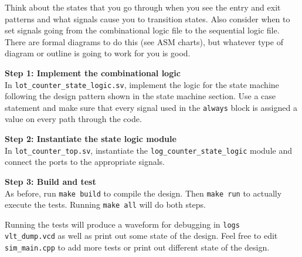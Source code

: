 \documentclass{article}
\begin{document}
Think about the states that you go through when you see the entry and exit
patterns and what signals cause you to transition states. Also consider when to
set signals going from the combinational logic file to the sequential logic
file. There are formal diagrams to do this (see ASM charts), but whatever type
of diagram or outline is going to work for you is good.

\noindent\textbf{Step 1: Implement the combinational logic}\\
In \texttt{lot\_counter\_state\_logic.sv}, implement the logic for the state
machine following the design pattern shown in the state machine section. Use a
case statement and make sure that every signal used in the \texttt{always} block
is assigned a value on every path through the code. 

\noindent\textbf{Step 2: Instantiate the state logic module}\\
In \texttt{lot\_counter\_top.sv}, instantiate the
\texttt{log\_counter\_state\_logic} module and connect the ports to the
appropriate signals.

\noindent\textbf{Step 3: Build and test}\\
As before, run \texttt{make build} to compile the design. Then \texttt{make run}
to actually execute the tests. Running \texttt{make all} will do both steps.

Running the tests will produce a waveform for debugging in
\texttt{logs\\vlt\_dump.vcd} as well as print out some state of the design. Feel
free to edit \texttt{sim\_main.cpp} to add more tests or print out different
state of the design.
    
\end{document}
